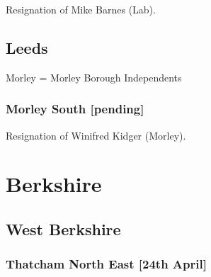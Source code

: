 \documentclass[a4paper,openany]{book}
\begin{document}
\begin{resultsiii}

Resignation of Mike Barnes (Lab).

\subsection*{Leeds}

Morley = Morley Borough Independents

%
%
%

\subsubsection*{Morley South \hspace*{\fill}\nolinebreak[1]%
	\enspace\hspace*{\fill}
	[pending]}


Resignation of Winifred Kidger (Morley).

\section{Berkshire}

\subsection*{West Berkshire}

\subsubsection*{Thatcham North East \hspace*{\fill}\nolinebreak[1]%
	\enspace\hspace*{\fill}
	[24th April]}



\end{resultsiii}
\end{document}
